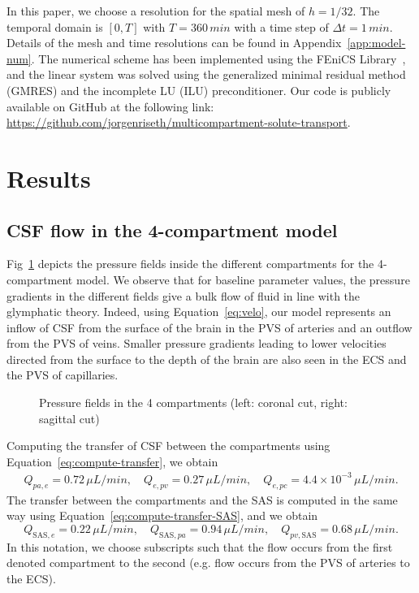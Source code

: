 \documentclass[a4paper,11pt]{article}
\newcommand{\1}{^{(1)}}
\newcommand{\2}{^{(2)}}
\newcommand {\dt}   {\Delta t}
\begin{document}
In this paper, we choose a resolution for the spatial mesh of $h=1/32$. The temporal domain is $[0,T]$ with $T=360 \, \si{min}$ with a time step  of $\dt = 1 \, \si{min}$. Details of the mesh and time resolutions can be found in Appendix~\ref{app:model-num}. The numerical scheme has been implemented using the FEniCS Library~\cite{alnaes2015fenics,LoggMardalEtAl2012}, and the linear system was solved using the generalized minimal residual method (GMRES) and the incomplete LU (ILU) preconditioner. Our code is publicly available on GitHub at the following link: \url{https://github.com/jorgenriseth/multicompartment-solute-transport}.


\section{Results}
\label{sec:results}

\label{sec:application}

\subsection{CSF flow in the 4-compartment model}
Fig~\ref{fig:pressure-Inulin-compartments} depicts the pressure fields inside the different compartments for the 4-compartment model. We observe that for baseline parameter values, the pressure gradients in the different fields give a bulk flow of fluid in line with the glymphatic theory. Indeed, using Equation~\eqref{eq:velo}, our model represents an inflow of CSF from the surface of the brain in the PVS of arteries and an outflow from the PVS of veins. Smaller pressure gradients leading to lower velocities directed from the surface to the depth of the brain are also seen in the ECS and the PVS of capillaries. 
\begin{figure}[htbp]
    \centering
    \caption{Pressure fields in the 4 compartments (left: coronal cut, right: sagittal cut)}
    \label{fig:pressure-Inulin-compartments}
\end{figure}

Computing the transfer of CSF between the compartments using Equation~\eqref{eq:compute-transfer}, we obtain 
\[
\begin{aligned}
    Q_{pa,e} =  0.72 \, \si{\mu L/min},\quad Q_{e,pv} = 0.27 \, \si{\mu L/min},\quad Q_{e,pc} = 4.4\times 10^{-3} \, \si{\mu L/min}.
\end{aligned}
\]
The transfer between the compartments and the SAS is computed in the same way using Equation~\eqref{eq:compute-transfer-SAS}, and we obtain
\[
Q_{\text{SAS},e} = 0.22 \, \si{\mu L/min} , \quad Q_{\text{SAS},pa} = 0.94 \, \si{\mu L/min},\quad Q_{pv,\text{SAS}} = 0.68 \, \si{\mu L/min}.
\]
In this notation, we choose subscripts such that the flow occurs from the first denoted compartment to the second (e.g. flow occurs from the PVS of arteries to the ECS). 
\end{document}
